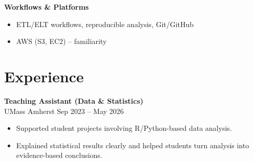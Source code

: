 \documentclass[10pt, letterpaper]{article}
\begin{document}
\textbf{Workflows \& Platforms}
\begin{itemize}
    \item ETL/ELT workflows, reproducible analysis, Git/GitHub
    \item AWS (S3, EC2) -- familiarity
\end{itemize}
   




    \section*{Experience}
    \textbf{Teaching Assistant (Data \& Statistics)} \\
UMass Amherst \hfill Sep 2023 -- May 2026
\begin{itemize}
    \item Supported student projects involving R/Python-based data analysis.
    \item Explained statistical results clearly and helped students turn analysis into evidence-based conclusions.
\end{itemize}
\end{document}
